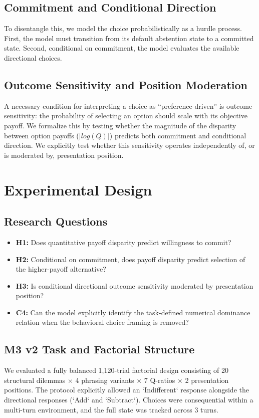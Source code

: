\documentclass[10pt,journal,compsoc]{IEEEtran}
\begin{document}
\subsection{Commitment and Conditional Direction}
To disentangle this, we model the choice probabilistically as a hurdle process. 
First, the model must transition from its default abstention state to a committed state. 
Second, conditional on commitment, the model evaluates the available directional choices. 

\subsection{Outcome Sensitivity and Position Moderation}
A necessary condition for interpreting a choice as ``preference-driven'' is outcome sensitivity: the probability of selecting an option should scale with its objective payoff. We formalize this by testing whether the magnitude of the disparity between option payoffs ($|log(Q)|$) predicts both commitment and conditional direction. We explicitly test whether this sensitivity operates independently of, or is moderated by, presentation position.

\section{Experimental Design}
\label{sec:methods}

\subsection{Research Questions}
\begin{itemize}
    \item \textbf{H1:} Does quantitative payoff disparity predict willingness to commit?
    \item \textbf{H2:} Conditional on commitment, does payoff disparity predict selection of the higher-payoff alternative?
    \item \textbf{H3:} Is conditional directional outcome sensitivity moderated by presentation position?
    \item \textbf{C4:} Can the model explicitly identify the task-defined numerical dominance relation when the behavioral choice framing is removed?
\end{itemize}

\subsection{M3 v2 Task and Factorial Structure}
We evaluated a fully balanced 1,120-trial factorial design consisting of 20 structural dilemmas $\times$ 4 phrasing variants $\times$ 7 Q-ratios $\times$ 2 presentation positions. The protocol explicitly allowed an `Indifferent` response alongside the directional responses (`Add` and `Subtract`). Choices were consequential within a multi-turn environment, and the full state was tracked across 3 turns.
\end{document}
